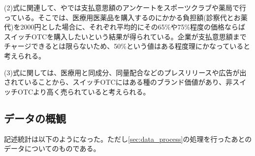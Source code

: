 \documentclass[a4paper,11pt,uplatex]{jsarticle}
\theoremstyle{definition}
\begin{document}
(2)式に関連して、\cite{narui2013}や\cite{narui2016}では支払意思額のアンケートをスポーツクラブや薬局で行っている。そこでは、医療用医薬品を購入するのにかかる負担額(診察代とお薬代)を2000円とした場合に、それぞれ平均的にその65\%や75\%程度の価格ならばスイッチOTCを購入したいという結果が得られている。企業が支払意思額までチャージできるとは限らないため、50\%という値はある程度理にかなっていると考えられる。

(3)式に関しては、医療用と同成分、同量配合などのプレスリリースや広告が出されていることから、スイッチOTCにはある種のブランド価値があり、非スイッチOTCより高く売られていると考えられる。

\subsection{データの概観}
記述統計は以下のようになった。ただし\ref{sec:data_process}の処理を行ったあとのデータについてのものである。
\end{document}
